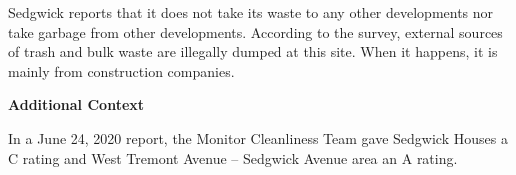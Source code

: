 Sedgwick reports that it does not take its waste to any other developments nor take garbage from other developments.  According to the survey, external sources of trash and bulk waste are illegally dumped at this site. When it happens, it is mainly from construction companies.

\textbf{Additional Context}

In a June 24, 2020 report, the Monitor Cleanliness Team gave Sedgwick Houses a C rating and West Tremont Avenue -- Sedgwick Avenue area an A rating.  